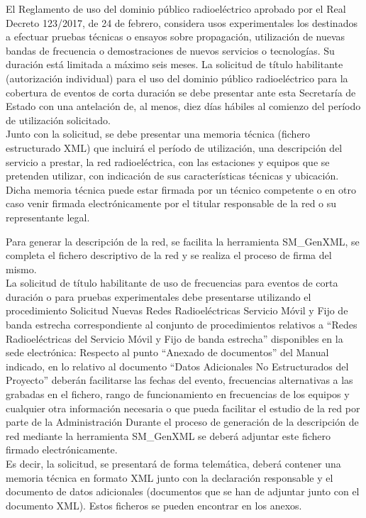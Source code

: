 El Reglamento de uso del dominio público radioeléctrico aprobado por el Real Decreto 123/2017, de 24 de febrero, considera usos experimentales los destinados a efectuar pruebas técnicas o ensayos sobre propagación, utilización de nuevas bandas de frecuencia o demostraciones de nuevos servicios o tecnologías. Su duración está limitada a máximo seis meses. 
La solicitud de título habilitante (autorización individual) para el uso del dominio público radioeléctrico para la cobertura de eventos de corta duración se debe presentar ante esta Secretaría de Estado con una antelación de, al menos, diez días hábiles al comienzo del período de utilización solicitado.\\ 

Junto con la solicitud, se debe presentar una memoria técnica (fichero estructurado XML) que incluirá el período de utilización, una descripción del servicio a prestar, la red radioeléctrica, con las estaciones y equipos que se pretenden utilizar, con indicación de sus características técnicas y ubicación. Dicha memoria técnica puede estar firmada por un técnico competente o en otro caso venir firmada electrónicamente por el titular responsable de la red o su representante legal. 

Para generar la descripción de la red, se facilita la herramienta SM\_GenXML, se completa el fichero descriptivo de la red y se realiza el proceso de firma del mismo. \\

La solicitud de título habilitante de uso de frecuencias para eventos de corta duración o para pruebas experimentales debe presentarse utilizando el procedimiento Solicitud Nuevas Redes Radioeléctricas Servicio Móvil y Fijo de banda estrecha correspondiente al conjunto de procedimientos relativos a “Redes Radioeléctricas del Servicio Móvil y Fijo de banda estrecha” disponibles en la sede electrónica:
Respecto al punto “Anexado de documentos” del Manual indicado, en lo relativo al documento “Datos Adicionales No Estructurados del Proyecto” deberán facilitarse las fechas del evento, frecuencias alternativas a las grabadas en el fichero, rango de funcionamiento en frecuencias de los equipos y cualquier otra información necesaria o que pueda facilitar el estudio de la red por parte de la Administración 
Durante el proceso de generación de la descripción de red mediante la herramienta SM\_GenXML se deberá adjuntar este fichero firmado electrónicamente.\\

Es decir, la solicitud, se presentará de forma telemática, deberá contener una memoria técnica en formato XML junto con la declaración responsable y el documento de datos adicionales (documentos que se han de adjuntar junto con el documento XML). Estos ficheros se pueden encontrar en los anexos.


